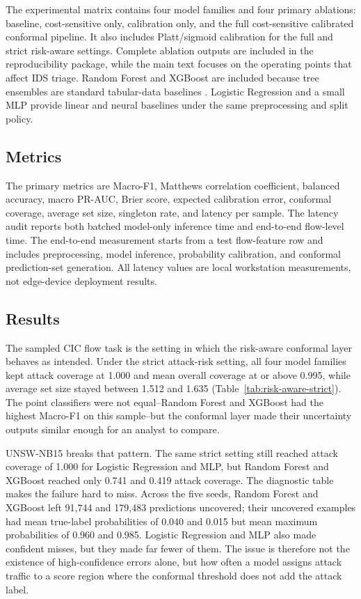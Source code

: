 \documentclass[11pt]{article}
\begin{document}
The experimental matrix contains four model families and four primary ablations: baseline, cost-sensitive only, calibration only, and the full cost-sensitive calibrated conformal pipeline. It also includes Platt/sigmoid calibration for the full and strict risk-aware settings. Complete ablation outputs are included in the reproducibility package, while the main text focuses on the operating points that affect IDS triage.
Random Forest and XGBoost are included because tree ensembles are standard tabular-data baselines \cite{breiman2001random,chen2016xgboost}. Logistic Regression and a small MLP provide linear and neural baselines under the same preprocessing and split policy.

\subsection{Metrics}

The primary metrics are Macro-F1, Matthews correlation coefficient, balanced accuracy, macro PR-AUC, Brier score, expected calibration error, conformal coverage, average set size, singleton rate, and latency per sample. The latency audit reports both batched model-only inference time and end-to-end flow-level time. The end-to-end measurement starts from a test flow-feature row and includes preprocessing, model inference, probability calibration, and conformal prediction-set generation. All latency values are local workstation measurements, not edge-device deployment results.

\subsection{Results}

The sampled CIC flow task is the setting in which the risk-aware conformal layer behaves as intended. Under the strict attack-risk setting, all four model families kept attack coverage at 1.000 and mean overall coverage at or above 0.995, while average set size stayed between 1.512 and 1.635 (Table~\ref{tab:risk-aware-strict}). The point classifiers were not equal--Random Forest and XGBoost had the highest Macro-F1 on this sample--but the conformal layer made their uncertainty outputs similar enough for an analyst to compare.



UNSW-NB15 breaks that pattern. The same strict setting still reached attack coverage of 1.000 for Logistic Regression and MLP, but Random Forest and XGBoost reached only 0.741 and 0.419 attack coverage. The diagnostic table makes the failure hard to miss. Across the five seeds, Random Forest and XGBoost left 91,744 and 179,483 predictions uncovered; their uncovered examples had mean true-label probabilities of 0.040 and 0.015 but mean maximum probabilities of 0.960 and 0.985. Logistic Regression and MLP also made confident misses, but they made far fewer of them. The issue is therefore not the existence of high-confidence errors alone, but how often a model assigns attack traffic to a score region where the conformal threshold does not add the attack label.
\end{document}
